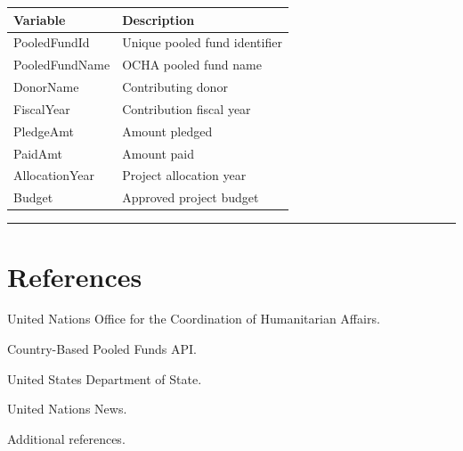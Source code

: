 \documentclass[
  11pt,
  letterpaper,
  DIV=11,
  numbers=noendperiod]{scrartcl}
\newcounter{none} %
\begin{document}
{\def\LTcaptype{none} %
\begin{longtable}[]{@{}ll@{}}
\toprule\noalign{}
Variable & Description \\
\midrule\noalign{}
\endhead
\bottomrule\noalign{}
\endlastfoot
PooledFundId & Unique pooled fund identifier \\
PooledFundName & OCHA pooled fund name \\
DonorName & Contributing donor \\
FiscalYear & Contribution fiscal year \\
PledgeAmt & Amount pledged \\
PaidAmt & Amount paid \\
AllocationYear & Project allocation year \\
Budget & Approved project budget \\
\end{longtable}
}

\begin{center}\rule{0.5\linewidth}{0.5pt}\end{center}

\section{References}\label{references}

United Nations Office for the Coordination of Humanitarian Affairs.

Country-Based Pooled Funds API.

United States Department of State.

United Nations News.

Additional references.
\end{document}
